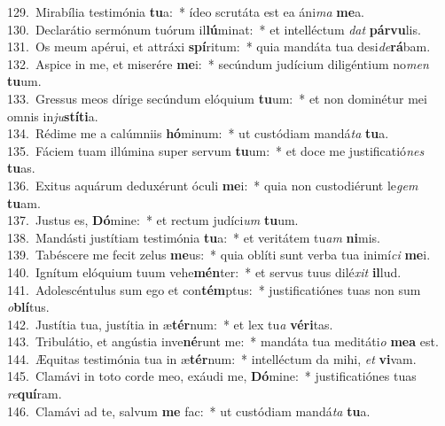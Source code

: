{129.~}Mirabília testimónia \textbf{tu}a:~* ídeo scrutáta est ea áni\textit{ma} \textbf{me}a.\\
{130.~}Declarátio sermónum tuórum il\textbf{lú}minat:~* et intelléctum \textit{dat} \textbf{pár}\textbf{vu}lis.\\
{131.~}Os meum apérui, et attráxi \textbf{spí}ritum:~* quia mandáta tua desi\textit{de}\textbf{rá}bam.\\
{132.~}Aspice in me, et miserére \textbf{me}i:~* secúndum judícium diligéntium no\textit{men} \textbf{tu}um.\\
{133.~}Gressus meos dírige secúndum elóquium \textbf{tu}um:~* et non dominétur mei omnis in\textit{ju}\textbf{stí}\textbf{ti}a.\\
{134.~}Rédime me a calúmniis \textbf{hó}minum:~* ut custódiam mandá\textit{ta} \textbf{tu}a.\\
{135.~}Fáciem tuam illúmina super servum \textbf{tu}um:~* et doce me justificatió\textit{nes} \textbf{tu}as.\\
{136.~}Exitus aquárum deduxérunt óculi \textbf{me}i:~* quia non custodiérunt le\textit{gem} \textbf{tu}am.\\
{137.~}Justus es, \textbf{Dó}mine:~* et rectum judíci\textit{um} \textbf{tu}um.\\
{138.~}Mandásti justítiam testimónia \textbf{tu}a:~* et veritátem tu\textit{am} \textbf{ni}mis.\\
{139.~}Tabéscere me fecit zelus \textbf{me}us:~* quia oblíti sunt verba tua inimí\textit{ci} \textbf{me}i.\\
{140.~}Ignítum elóquium tuum vehe\textbf{mén}ter:~* et servus tuus dilé\textit{xit} \textbf{il}lud.\\
{141.~}Adolescéntulus sum ego et con\textbf{tém}ptus:~* justificatiónes tuas non sum \textit{o}\textbf{blí}tus.\\
{142.~}Justítia tua, justítia in æ\textbf{tér}num:~* et lex tu\textit{a} \textbf{vé}\textbf{ri}tas.\\
{143.~}Tribulátio, et angústia inve\textbf{né}runt me:~* mandáta tua meditáti\textit{o} \textbf{me}\textbf{a} est.\\
{144.~}Æquitas testimónia tua in æ\textbf{tér}num:~* intelléctum da mihi, \textit{et} \textbf{vi}vam.\\
{145.~}Clamávi in toto corde meo, exáudi me, \textbf{Dó}mine:~* justificatiónes tuas \textit{re}\textbf{quí}ram.\\
{146.~}Clamávi ad te, salvum \textbf{me} fac:~* ut custódiam mandá\textit{ta} \textbf{tu}a.\\
